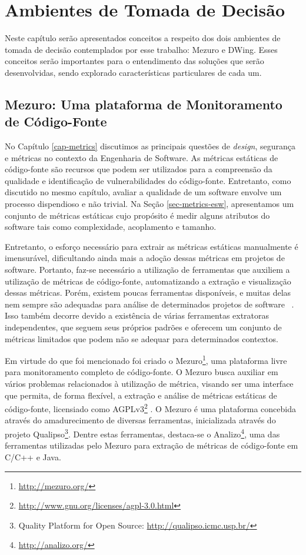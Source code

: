 \chapter{Ambientes de Tomada de Decisão}
\label{cap-decision-making-environment}


%

Neste capítulo serão apresentados conceitos a respeito dos dois ambientes de tomada de decisão contemplados por esse trabalho: Mezuro e DWing. Esses conceitos serão importantes para o entendimento das soluções que serão desenvolvidas, sendo explorado características particulares de cada um.

%

\section{Mezuro: Uma plataforma de Monitoramento de Código-Fonte}
\label{cap-mezuro}

No Capítulo \ref{cap-metrics} discutimos as principais questões de \emph{design}, segurança e métricas no contexto da Engenharia de Software. As métricas estáticas de código-fonte são recursos que podem ser utilizados para a compreensão da qualidade e identificação de vulnerabilidades do código-fonte. Entretanto, como discutido no mesmo capítulo, avaliar a qualidade de um software envolve um processo dispendioso e não trivial. Na Seção \ref{sec-metrics-esw}, apresentamos um conjunto de métricas estáticas cujo propósito é medir alguns atributos do software tais como complexidade, acoplamento e tamanho. 

%

Entretanto, o esforço necessário para extrair as métricas estáticas manualmente é imensurável, dificultando ainda mais a adoção dessas métricas em projetos de software.
%
Portanto, faz-se necessário a utilização de ferramentas que auxiliem a utilização de métricas de código-fonte, automatizando a extração e visualização dessas métricas.
%
Porém, existem poucas ferramentas disponíveis, e muitas delas nem sempre são adequadas para análise de determinados projetos de software ~\cite{meirelles2010mezuro}.
%
Isso também decorre devido a existência de várias ferramentas extratoras independentes, que seguem seus próprios padrões e oferecem um conjunto de métricas limitados que podem não se adequar para determinados contextos.

%

Em virtude do que foi mencionado foi criado o Mezuro\footnote{\url{http://mezuro.org/}}, uma plataforma livre para monitoramento completo de código-fonte. O Mezuro busca auxiliar em vários problemas relacionados à utilização de métrica, visando ser uma interface que permita, de forma flexível, a extração e análise de métricas estáticas de código-fonte, licensiado como AGPLv3\footnote{\url{http://www.gnu.org/licenses/agpl-3.0.html}} \cite{manzo2014}. O Mezuro é uma plataforma concebida através do amadurecimento de diversas ferramentas, inicializada através do projeto Qualipso\footnote{Quality Platform for Open Source: \url{http://qualipso.icmc.usp.br/}}. Dentre estas ferramentas, destaca-se o Analizo\footnote{\url{http://analizo.org/}}, uma das ferramentas utilizadas pelo Mezuro para extração de métricas de código-fonte em C/C++ e Java.

